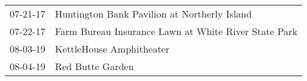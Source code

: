 \begin{supertabular}{p{0.07\textwidth}p{0.23\textwidth}}
 07-21-17 &          Huntington Bank Pavilion at Northerly Island \\
 07-22-17 &  Farm Bureau Insurance Lawn at White River State Park \\
 08-03-19 &                              KettleHouse Amphitheater \\
 08-04-19 &                                      Red Butte Garden \\
\end{supertabular}
